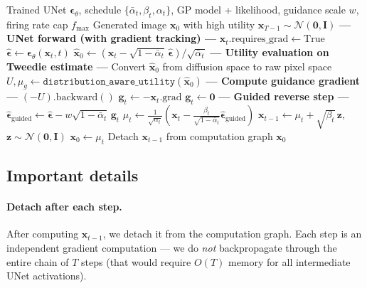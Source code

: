 \documentclass[11pt]{article}
\newcommand{\xb}{\mathbf{x}}
\newcommand{\zb}{\mathbf{z}}
\newcommand{\eb}{\boldsymbol{\epsilon}}
\newcommand{\gb}{\mathbf{g}}
\newcommand{\Ib}{\mathbf{I}}
\newcommand{\alphabar}{\bar{\alpha}}
\begin{document}
\begin{algorithm}[H]
\caption{Guided DDPM Reverse Process}
\label{alg:guided_ddpm}
\begin{algorithmic}[1]
\Require Trained UNet $\eb_\theta$, schedule $\{\alphabar_t, \beta_t, \alpha_t\}$,
         GP model + likelihood, guidance scale $w$, firing rate cap $f_{\max}$
\Ensure Generated image $\xb_0$ with high utility
\State $\xb_{T-1} \sim \mathcal{N}(\mathbf{0}, \Ib)$
    \State \textbf{--- UNet forward (with gradient tracking) ---}
    \State $\xb_t.\text{requires\_grad} \gets \text{True}$
    \State $\hat{\eb} \gets \eb_\theta(\xb_t, t)$
    \State $\hat{\xb}_0 \gets (\xb_t - \sqrt{1-\alphabar_t}\,\hat{\eb}) / \sqrt{\alphabar_t}$
    \Statex
    \State \textbf{--- Utility evaluation on Tweedie estimate ---}
    \State Convert $\hat{\xb}_0$ from diffusion space to raw pixel space
    \State $U, \mu_g \gets \texttt{distribution\_aware\_utility}(\hat{\xb}_0)$
    \Statex
    \State \textbf{--- Compute guidance gradient ---}
        \State $(-U).\text{backward}()$
        \State $\gb_t \gets -\xb_t.\text{grad}$
            \Comment{$\gb_t = \nabla_{\xb_t} U(\hat{\xb}_0)$}
    \Else
        \State $\gb_t \gets \mathbf{0}$
    \EndIf
    \Statex
    \State \textbf{--- Guided reverse step ---}
    \State $\hat{\eb}_{\text{guided}} \gets \hat{\eb} - w\sqrt{1-\alphabar_t}\,\gb_t$
    \State $\mu_t \gets \frac{1}{\sqrt{\alpha_t}}(\xb_t - \frac{\beta_t}{\sqrt{1-\alphabar_t}}\hat{\eb}_{\text{guided}})$
        \State $\xb_{t-1} \gets \mu_t + \sqrt{\beta_t}\,\zb$,
            \quad $\zb \sim \mathcal{N}(\mathbf{0}, \Ib)$
    \Else
        \State $\xb_0 \gets \mu_t$
    \EndIf
    \State Detach $\xb_{t-1}$ from computation graph
\EndFor
\State \Return $\xb_0$
\end{algorithmic}
\end{algorithm}

\subsection{Important details}

\paragraph{Detach after each step.}
After computing $\xb_{t-1}$, we detach it from the computation graph.
Each step is an independent gradient computation --- we do \emph{not} backpropagate
through the entire chain of $T$ steps (that would require $O(T)$ memory for all
intermediate UNet activations).
\end{document}
